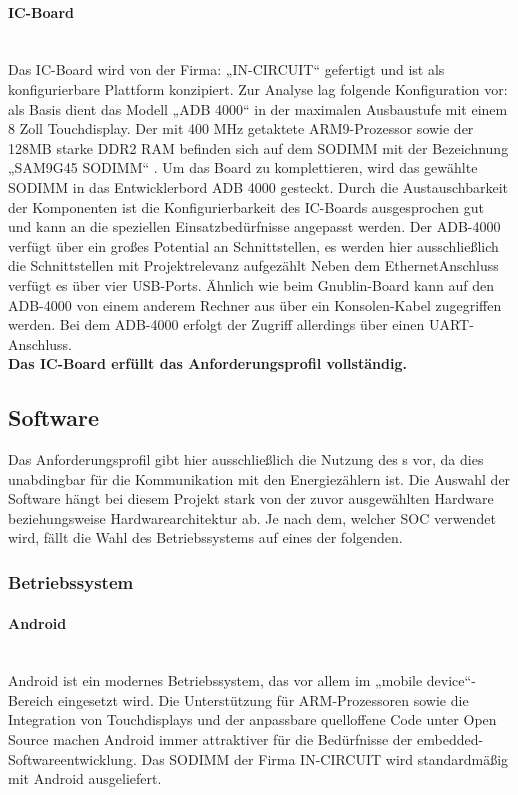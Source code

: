 \documentclass[../Bachelorarbeit.tex]{subfiles}
\begin{document}
\paragraph{IC-Board}\mbox{}\\
\label{para:ic-board} 
Das IC-Board wird von der Firma: „IN-CIRCUIT“ gefertigt und ist als konfigurierbare Plattform konzipiert. Zur Analyse lag folgende Konfiguration vor: als Basis dient das Modell „ADB 4000“
\parencite[vgl.][]{ic_adb_4000_interface} 
in der maximalen Ausbaustufe mit einem 8 Zoll Touchdisplay. Der mit 400 MHz getaktete \acs{ARM}9-Prozessor sowie der 128MB starke DDR2 RAM befinden sich auf dem \acf{SODIMM} mit der Bezeichnung „SAM9G45 SODIMM“ 
\parencite[vgl.][]{ic_SAM9G45_sodimm}.
Um das Board zu 
komplettieren, wird das gewählte \ac{SODIMM} in das Entwicklerbord ADB 4000 
gesteckt. Durch die Austauschbarkeit der Komponenten ist die Konfigurierbarkeit des IC-Boards ausgesprochen gut und kann an die speziellen Einsatzbedürfnisse angepasst 
werden. Der ADB-4000 verfügt über ein großes Potential an Schnittstellen, es werden hier 
ausschließlich die Schnittstellen mit Projektrelevanz aufgezählt Neben dem EthernetAnschluss verfügt es über vier USB-Ports. Ähnlich wie beim Gnublin-Board kann auf den ADB-4000 von einem anderem Rechner aus über ein Konsolen-Kabel zugegriffen werden.
Bei dem ADB-4000 erfolgt der Zugriff allerdings über einen \ac{UART}-Anschluss.\\
\textbf{Das IC-Board erfüllt das Anforderungsprofil vollständig.}

\subsection{Software}
Das Anforderungsprofil gibt hier ausschließlich die Nutzung des s vor, da
dies unabdingbar für die Kommunikation mit den Energiezählern ist. Die Auswahl der 
Software hängt bei diesem Projekt stark von der zuvor ausgewählten Hardware 
beziehungsweise Hardwarearchitektur ab. Je nach dem, welcher \ac{SOC} verwendet wird, 
fällt die Wahl des Betriebssystems auf eines der folgenden.

\subsubsection*{Betriebssystem}

\paragraph{Android}\mbox{}\\ 
Android ist ein modernes Betriebssystem, das vor allem im „mobile device“-Bereich 
eingesetzt wird. Die Unterstützung für \ac{ARM}-Prozessoren sowie die Integration von 
Touchdisplays und der anpassbare quelloffene Code unter Open Source machen Android 
immer attraktiver für die Bedürfnisse der  embedded-Softwareentwicklung. Das \ac{SODIMM} der Firma IN-CIRCUIT wird standardmäßig mit Android ausgeliefert. 
\end{document}
